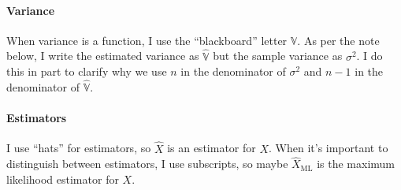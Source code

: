 \paragraph{Variance} When variance is a function, I use the ``blackboard''
letter $\mathbb{V}$. As per the note below, I write the estimated variance
as $\hat{\mathbb{V}}$ but the sample variance as $\sigma^2$. I do this in
part to clarify why we use $n$ in the denominator of $\sigma^2$ and $n-1$
in the denominator of $\hat{\mathbb{V}}$.

\paragraph{Estimators} I use ``hats'' for estimators, so $\hat{X}$ is an
estimator for $X$. When it's important to distinguish between estimators,
I use subscripts, so maybe $\hat{X}_\mathrm{ML}$ is the maximum likelihood
estimator for $X$.
